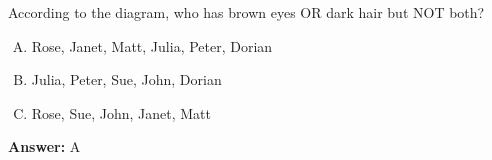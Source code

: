 \documentclass[12pt]{article}
\begin{document}
\begin{enumerate}[1.]
    \bigskip

    According to the diagram, who has brown eyes OR dark hair but NOT both?

    \bigskip

    \begin{enumerate}[A.]
        \item Rose, Janet, Matt, Julia, Peter, Dorian
        \item Julia, Peter, Sue, John, Dorian
        \item Rose, Sue, John, Janet, Matt
    \end{enumerate}

    \bigskip

    \textbf{Answer:} A

\end{enumerate}
\end{document}
